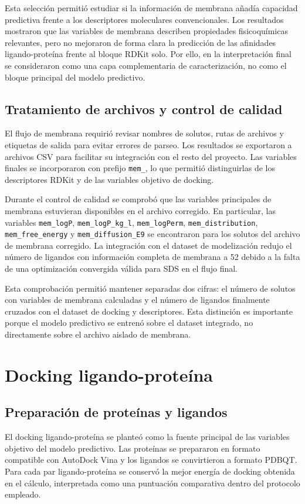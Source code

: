\documentclass[
  spanish,
  a4paper,
  12pt,
  oneside,
  openany]{memoir}
\newcommand{\apendice}[1]{\chapter{#1}}
\begin{document}
Esta selección permitió estudiar si la información de membrana añadía
capacidad predictiva frente a los descriptores moleculares
convencionales. Los resultados mostraron que las variables de membrana
describen propiedades fisicoquímicas relevantes, pero no mejoraron de
forma clara la predicción de las afinidades ligando-proteína frente al
bloque RDKit solo. Por ello, en la interpretación final se consideraron
como una capa complementaria de caracterización, no como el bloque
principal del modelo predictivo.

\section{Tratamiento de archivos y control de calidad}

El flujo de membrana requirió revisar nombres de solutos, rutas de
archivos y etiquetas de salida para evitar errores de parseo. Los
resultados se exportaron a archivos CSV para facilitar su integración
con el resto del proyecto. Las variables finales se incorporaron con
prefijo \texttt{mem\_}, lo que permitió distinguirlas de los
descriptores RDKit y de las variables objetivo de docking.

Durante el control de calidad se comprobó que las variables principales
de membrana estuvieran disponibles en el archivo corregido. En
particular, las variables \texttt{mem\_logP}, \texttt{mem\_logP\_kg\_l},
\texttt{mem\_logPerm}, \texttt{mem\_distribution},
\texttt{mem\_free\_energy} y \texttt{mem\_diffusion\_E9} se encontraron
para los solutos del archivo de membrana corregido. La integración con
el dataset de modelización redujo el número de ligandos con información
completa de membrana a 52 debido a la falta de una optimización
convergida válida para SDS en el flujo final.

Esta comprobación permitió mantener separadas dos cifras: el número de
solutos con variables de membrana calculadas y el número de ligandos
finalmente cruzados con el dataset de docking y descriptores. Esta
distinción es importante porque el modelo predictivo se entrenó sobre el
dataset integrado, no directamente sobre el archivo aislado de membrana.

\apendice{Docking ligando-proteína}

\section{Preparación de proteínas y ligandos}

El docking ligando-proteína se planteó como la fuente principal de las
variables objetivo del modelo predictivo. Las proteínas se prepararon en
formato compatible con AutoDock Vina y los ligandos se convirtieron a
formato PDBQT. Para cada par ligando-proteína se conservó la mejor
energía de docking obtenida en el cálculo, interpretada como una
puntuación comparativa dentro del protocolo empleado.
\end{document}
